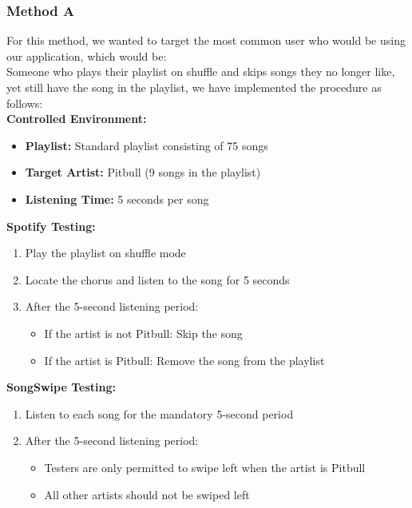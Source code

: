 \documentclass{article}
\begin{document}
\subsubsection*{Method A}
For this method, we wanted to target the most common user who would be using our application, which would be:\\
    
Someone who plays their playlist on shuffle and skips songs they no longer like, yet still have the song in the playlist, we have implemented the procedure as follows: \\

   \textbf{Controlled Environment:}
    
    \begin{itemize}
    \item \textbf{Playlist:} Standard playlist consisting of 75 songs
    \item \textbf{Target Artist:} Pitbull (9 songs in the playlist)
    \item \textbf{Listening Time:} 5 seconds per song
    \end{itemize}
    
    \textbf{Spotify Testing:} 
    
    \begin{enumerate}
        \item Play the playlist on shuffle mode
        \item Locate the chorus and listen to the song for 5 seconds
        \item After the 5-second listening period:
            \begin{itemize}
                \item If the artist is not Pitbull: Skip the song
                \item If the artist is Pitbull: Remove the song from the playlist
            \end{itemize}
    \end{enumerate}

    \textbf{SongSwipe Testing:}
    
    \begin{enumerate}
        \item Listen to each song for the mandatory 5-second period
        \item After the 5-second listening period:
            \begin{itemize}
                \item Testers are only permitted to swipe left when the artist is Pitbull
                \item All other artists should not be swiped left
            \end{itemize}
    \end{enumerate}
\end{document}
